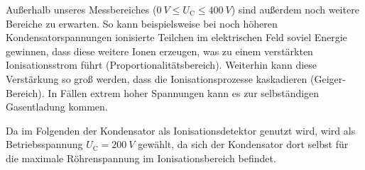 \documentclass[11pt, a4paper]{article}
\numberwithin{equation}{section}
\begin{document}
Außerhalb unseres Messbereiches ($\SI{0}{V} \leq U_\mathrm{C} \leq \SI{400}{V}$) sind außerdem noch weitere Bereiche zu erwarten.
So kann beispielsweise bei noch höheren Kondensatorspannungen ionisierte Teilchen im elektrischen Feld soviel Energie gewinnen, dass diese weitere Ionen erzeugen, was zu einem verstärkten Ionisationsstrom führt (Proportionalitätsbereich).
Weiterhin kann diese Verstärkung so groß werden, dass die Ionisationsprozesse kaskadieren (Geiger-Bereich).
In Fällen extrem hoher Spannungen kann es zur selbständigen Gasentladung kommen.

Da im Folgenden der Kondensator als Ionisationsdetektor genutzt wird, wird als Betriebsspannung $U_\mathrm{C} = \SI{200}{V}$ gewählt, da sich der Kondensator dort selbst für die maximale Röhrenspannung im Ionisationsbereich befindet.
\end{document}
